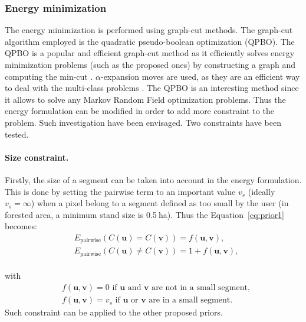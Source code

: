 \subsubsection{Energy minimization}
The energy minimization is performed using graph-cut methods. The graph-cut algorithm employed is the quadratic pseudo-boolean optimization (QPBO). The QPBO is a popular and efficient graph-cut method as it efficiently solves energy minimization problems (such as the proposed ones) by constructing a graph and computing the min-cut \citep{kolmogorov2007minimizing}. $\alpha$-expansion moves are used, as they are an efficient way to deal with the multi-class problems \citep{kolmogorov2004energy}. The QPBO is an interesting method since it allows to solve any Markov Random Field optimization problems. Thus the energy formulation can be modified in order to add more constraint to the problem. Such investigation have been envisaged. Two constraints have been tested. \\

\paragraph{Size constraint. \\}
Firstly, the size of a segment can be taken into account in the energy formulation. This is done by setting the pairwise term to an important value $v_{s}$ (ideally $v_{s}=\infty$) when a pixel belong to a segment defined as too small by the user (in forested area, a minimum stand size is 0.5$\:$ha). Thus the Equation~\ref{eq:prior1} becomes:
\begin{equation}
\begin{aligned}
& E_{\text{pairwise}}(C(\mathbf{u}) = C(\mathbf{v}))=f(\mathbf{u},\mathbf{v}), \\
& E_{\text{pairwise}}(C(\mathbf{u}) \neq C(\mathbf{v}))=1 + f(\mathbf{u},\mathbf{v}),
\end{aligned}
\label{eq:prior1b}
\end{equation}\\
with
\begin{equation}
\begin{aligned}
& f(\mathbf{u},\mathbf{v})=0 \text{ if $\mathbf{u}$ and $\mathbf{v}$ are not in a small segment}, \\
& f(\mathbf{u},\mathbf{v})=v_{s} \text{ if $\mathbf{u}$ or $\mathbf{v}$ are in a small segment}.
\end{aligned}
\label{eq:prior1bf}
\end{equation}
Such constraint can be applied to the other proposed priors.

